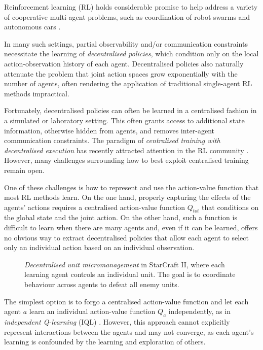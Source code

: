 \documentclass{article}
\begin{document}
Reinforcement learning (RL) holds considerable promise to help address a variety of cooperative multi-agent problems, such as coordination of robot swarms \cite{huttenrauch_guided_2017} and autonomous cars \cite{cao_overview_2012}. 

In many such settings, partial observability and/or communication constraints necessitate the learning of \textit{decentralised policies}, which condition only on the local action-observation history of each agent. Decentralised policies also naturally attenuate the problem that joint action spaces grow exponentially with the number of agents, often rendering the application of traditional single-agent RL methods impractical.

Fortunately, decentralised policies can often be learned in a centralised fashion in a simulated or laboratory setting. This often grants access to additional state information, otherwise hidden from agents, and removes inter-agent communication constraints. 
The paradigm of \textit{centralised training with decentralised execution} \cite{oliehoek_optimal_2008,kraemer_multi-agent_2016} has recently attracted attention in the RL community \cite{jorge_learning_2016,foerster_counterfactual_2017}. 
However, many challenges surrounding how to best exploit centralised training remain open.

One of these challenges is how to represent and use the action-value function that most RL methods learn.  On the one hand, properly capturing the effects of the agents' actions requires a centralised action-value function $Q_{tot}$ that conditions on the global state and the joint action.  On the other hand, such a function is difficult to learn when there are many agents and, even if it can be learned, offers no obvious way to extract decentralised policies that allow each agent to select only an individual action based on an individual observation.

\begin{figure}[t!]
	\centering
	\caption{\textit{Decentralised unit micromanagement} in StarCraft II, where each learning agent controls an individual unit. The goal is to coordinate behaviour across agents to defeat all enemy units.}
	\label{fig:starcraft_screenshots}
\end{figure}

The simplest option is to forgo a centralised action-value function and let each agent $a$ learn an individual action-value function $Q_a$ independently, as in \emph{independent Q-learning} (IQL) \cite{tan_multi-agent_1993}.  However, this approach cannot explicitly represent interactions between the agents and may not converge, as each agent's learning is confounded by the learning and exploration of others.
\end{document}
